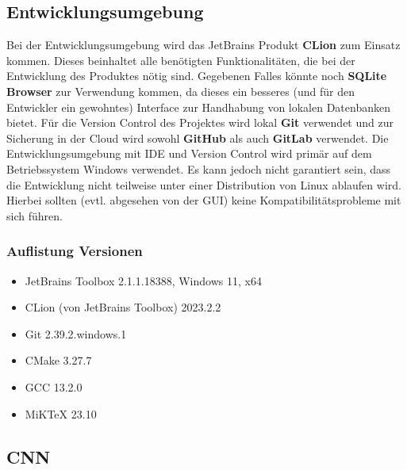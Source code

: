 \subsection{Entwicklungsumgebung}
\label{sec:AnalyseEntwicklungsumgebung}
Bei der Entwicklungsumgebung wird das JetBrains Produkt \textbf{CLion} zum Einsatz kommen. Dieses beinhaltet alle benötigten Funktionalitäten, die bei der Entwicklung des Produktes nötig sind. Gegebenen Falles könnte noch \textbf{SQLite Browser} zur Verwendung kommen, da dieses ein besseres (und für den Entwickler ein gewohntes) Interface zur Handhabung von lokalen Datenbanken bietet. Für die Version Control des Projektes wird lokal \textbf{Git} verwendet und zur Sicherung in der Cloud wird sowohl \textbf{GitHub} als auch \textbf{GitLab} verwendet. Die Entwicklungsumgebung mit IDE und Version Control wird primär auf dem Betriebssystem Windows verwendet. Es kann jedoch nicht garantiert sein, dass die Entwicklung nicht teilweise unter einer Distribution von Linux ablaufen wird. Hierbei sollten (evtl. abgesehen von der GUI) keine Kompatibilitätsprobleme mit sich führen. 
\subsubsection{Auflistung Versionen}
\label{sec:AnalyseDevEnvAuflistung}
\begin{itemize}
	\item JetBrains Toolbox 2.1.1.18388, Windows 11, x64
	\item CLion (von JetBrains Toolbox) 2023.2.2
	\item Git 2.39.2.windows.1
	\item CMake 3.27.7
	\item GCC 13.2.0
	\item MiKTeX 23.10
\end{itemize}

\subsection{CNN}
\label{sec:AnalyseCNN}
